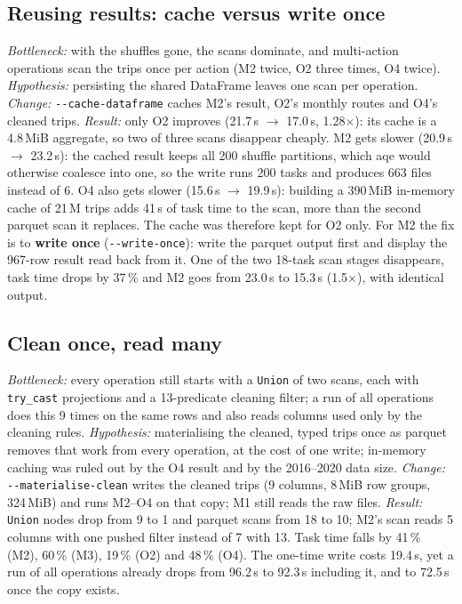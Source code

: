 \documentclass[sigconf]{acmart}
\begin{document}
\subsection{Reusing results: cache versus write once}
\emph{Bottleneck:} with the shuffles gone, the scans dominate, and multi-action
operations scan the trips once per action (M2 twice, O2 three times, O4 twice).
\emph{Hypothesis:} persisting the shared DataFrame leaves one scan per
operation. \emph{Change:} \texttt{-{}-cache-dataframe} caches M2's result, O2's
monthly routes and O4's cleaned trips. \emph{Result:} only O2 improves (21.7\,s
$\to$ 17.0\,s, 1.28$\times$): its cache is a 4.8\,MiB aggregate, so two of
three scans disappear cheaply. M2 gets slower (20.9\,s $\to$ 23.2\,s): the
cached result keeps all 200 shuffle partitions, which \gls{aqe} would
otherwise coalesce into one, so the write runs 200 tasks and produces 663 files
instead of 6. O4 also gets slower (15.6\,s $\to$ 19.9\,s): building a 390\,MiB
in-memory cache of 21\,M trips adds 41\,s of task time to the scan, more than the
second parquet scan it replaces. The cache was therefore kept for O2 only. For
M2 the fix is to \textbf{write once} (\texttt{-{}-write-once}): write the
parquet output first and display the 967-row result read back from it. One of the
two 18-task scan stages disappears, task time drops by 37\,\% and M2 goes from
23.0\,s to 15.3\,s (1.5$\times$), with identical output.

\subsection{Clean once, read many}
\emph{Bottleneck:} every operation still starts with a \texttt{Union} of two
scans, each with \texttt{try\_cast} projections and a 13-predicate cleaning
filter; a run of all operations does this 9 times on the same rows and also reads
columns used only by the cleaning rules. \emph{Hypothesis:} materialising the cleaned,
typed trips once as parquet removes that work from every operation, at the cost
of one write; in-memory caching was ruled out by the O4 result and by the 2016--2020
data size. \emph{Change:} \texttt{-{}-materialise-clean} writes the cleaned
trips (9 columns, 8\,MiB row groups, 324\,MiB) and runs M2--O4 on that copy;
M1 still reads the raw files. \emph{Result:} \texttt{Union} nodes drop from 9 to
1 and parquet scans from 18 to 10; M2's scan reads 5 columns with one pushed
filter instead of 7 with 13. Task time falls by 41\,\% (M2), 60\,\% (M3), 19\,\%
(O2) and 48\,\% (O4). The one-time write costs 19.4\,s, yet a run of all
operations already drops from 96.2\,s to 92.3\,s including it, and to 72.5\,s once
the copy exists.
\end{document}
